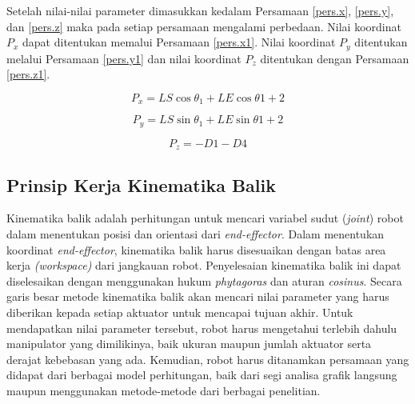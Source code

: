 Setelah nilai-nilai parameter dimasukkan kedalam Persamaan \ref{pers.x}, \ref{pers.y}, dan \ref{pers.z} maka pada setiap persamaan mengalami perbedaan. Nilai koordinat $P_{x}$ dapat ditentukan memalui Persamaan \ref{pers.x1}. Nilai koordinat $P_{y}$ ditentukan melalui Persamaan \ref{pers.y1} dan nilai koordinat $P_{z}$ ditentukan dengan Persamaan \ref{pers.z1}.

\begin{equation}
P_{x}=LS\cos\theta_{1}+LE\cos\theta{1+2}
\label{pers.x1}
\end{equation}

\begin{equation}
P_{y}=LS\sin\theta_{1}+LE\sin\theta{1+2}
\label{pers.y1}
\end{equation}

\begin{equation}
P_{z}=-D1-D4
\label{pers.z1}
\end{equation}

\subsection{Prinsip Kerja Kinematika Balik}
Kinematika balik adalah perhitungan untuk mencari variabel sudut (\textit{joint}) robot dalam menentukan posisi dan orientasi dari \textit{end-effector}. Dalam menentukan koordinat \textit{end-effector}, kinematika balik harus disesuaikan dengan batas area kerja \textit{(workspace)} dari jangkauan robot. Penyelesaian kinematika balik ini dapat diselesaikan dengan menggunakan hukum \textit{phytagoras} dan aturan \textit{cosinus}. 
Secara garis besar metode kinematika balik akan mencari nilai parameter yang harus diberikan kepada setiap aktuator untuk mencapai tujuan akhir. Untuk mendapatkan nilai parameter tersebut, robot harus mengetahui terlebih dahulu manipulator yang dimilikinya, baik ukuran maupun jumlah aktuator serta derajat kebebasan yang ada. Kemudian, robot harus ditanamkan persamaan yang didapat dari berbagai model perhitungan, baik dari segi analisa grafik langsung maupun menggunakan metode-metode dari berbagai penelitian. 

